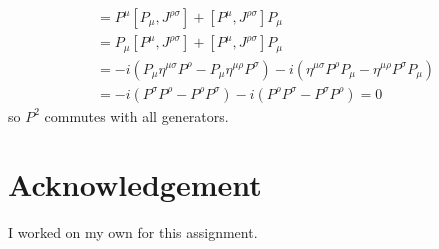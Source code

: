 \documentclass[10pt, a4paper]{article}
\begin{document}
\begin{enumerate}
  \begin{align*}
    [P^{\mu} P_\mu, J^{\rho \sigma}] &= P^{\mu}[P_\mu, J^{\rho \sigma}] + [P^{\mu}, J^{\rho \sigma}] P_\mu\\
    &= P_{\mu}[P^\mu, J^{\rho \sigma}] + [P^{\mu}, J^{\rho \sigma}] P_\mu\\
    &=  -i \left(P_{\mu}\eta^{\mu \sigma}P^\rho- P_{\mu}\eta^{\mu \rho} P^\sigma\right) -i \left(\eta^{\mu \sigma}P^\rho P_{\mu}- \eta^{\mu \rho} P^\sigma P_{\mu}\right)\\
    &= -i\left(P^{\sigma}P^\rho- P^{\rho} P^\sigma\right) -i \left(P^\rho P^{\sigma}- P^\sigma P^{\rho}\right) = 0
  \end{align*} 
  so $P^2$ commutes with all generators.  

\end{enumerate}




\section{Acknowledgement}
I worked on my own for this assignment.


\makereferences


\end{document}
